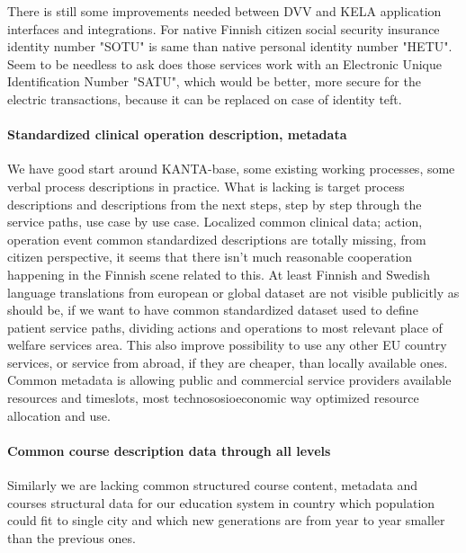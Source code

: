 There is still some improvements needed between DVV and KELA application
interfaces and integrations. For native Finnish citizen social security
insurance identity number "SOTU" is same than native personal identity number
"HETU". Seem to be needless to ask does those services work with an Electronic
Unique Identification Number "SATU", which would be better, more secure for
the electric transactions, because it can be replaced on case of identity teft.

\paragraph{Standardized clinical operation description, metadata}
\label{clinical_data}

We have good start around KANTA-base, some existing working processes, some
verbal process descriptions in practice. What is lacking is target process
descriptions and descriptions from the next steps, step by step through the
service paths, use case by use case\cite{LifeEventDetailDrivenProcessQuides}.
Localized common clinical data\cite{HealthEventsActionsMetaData}; action,
operation event common standardized descriptions are totally missing, from
citizen perspective, it seems that there isn't much reasonable cooperation
happening in the Finnish scene related to this. At least Finnish and Swedish
language translations from european or global dataset are not visible
publicitly as should be, if we want to have common standardized dataset used
to define patient service paths, dividing actions and operations to most
relevant place of welfare services area. This also improve possibility to use
any other EU country services, or service from abroad, if they are cheaper,
than locally available ones. Common metadata is allowing public and
commercial service providers available resources and timeslots, most
technososioeconomic way optimized resource allocation and use.

\paragraph{Common course description data through all levels}
\label{course_data}

Similarly we are lacking common structured course content, metadata and
courses structural data for our education system
\cite{CoursesAndRequirements} in country which population could fit to single
city and which new generations are from year to year smaller than the previous
ones.


